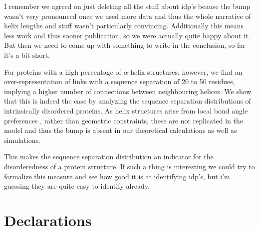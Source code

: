 \documentclass[reprint,amsmath,amssymb,rmp,onecolumn,notitlepage,11pt]{revtex4-1}
\newcommand{\red}[1]{\textcolor{red!80!black}{#1}}
\newcommand{\gray}[1]{\textcolor{gray!80!black}{#1}}
\begin{document}
\red{I remember we agreed on just deleting all the stuff about idp's beause the bump wasn't very pronounced once we used more data and thus the whole narrative of helix lengths and stuff wasn't particularly convincing. Additionally this means less work and thus sooner publication, so we were actually quite happy about it. But then we need to come up with something to write in the conclusion, so far it's a bit short.}

\gray{For proteins with a high percentage of $\alpha$-helix structures, however, we find an over-representation of links with a sequence separation of 20 to 50 residues, implying a higher number of connections between neighbouring helices. We show that this is indeed the case by analyzing the sequence separation distributions of intrinsically disordered proteins. As helix structures arise from local bond angle preferences \cite{Danielsson2010}, rather than geometric constraints, these are not replicated in the model and thus the bump is absent in our theoretical calculations as well as simulations.}

\gray{This makes the sequence separation distribution an indicator for the disorderedness of a protein structure. If such a thing is interesting we could try to formalize this measure and see how good it is at identifying idp's, but i'm guessing they are quite easy to identify already.}

\section*{Declarations}
\end{document}
